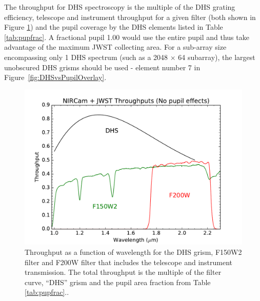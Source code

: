 \documentclass[iop]{emulateapj}
\begin{document}
The throughput for DHS spectroscopy is the multiple of the DHS grating efficiency, telescope and instrument throughput for a given filter (both shown in Figure \ref{fig:DHSthrough}) and the pupil coverage by the DHS elements listed in Table \ref{tab:pupfrac}.
A fractional pupil 1.00 would use the entire pupil and thus take advantage of the maximum JWST collecting area.
For a sub-array size encompassing only 1 DHS spectrum (such as a 2048 $\times$ 64 subarray), the largest unobscured DHS grisms should be used - element number 7 in Figure~\ref{fig:DHSvsPupilOverlay}.

\begin{figure}[!ht]
\centering
\includegraphics[width=1.0\columnwidth]{NIRCam+OTE_SWA_DHS_and_F150W2_efficiency.pdf}
\caption{Throughput as a function of wavelength for the DHS grism, F150W2 filter and F200W filter that includes the telescope and instrument transmission. The total throughput is the multiple of the filter curve, ``DHS'' grism and the pupil area fraction from Table \ref{tab:pupfrac}..}\label{fig:DHSthrough}
\end{figure}
\end{document}
